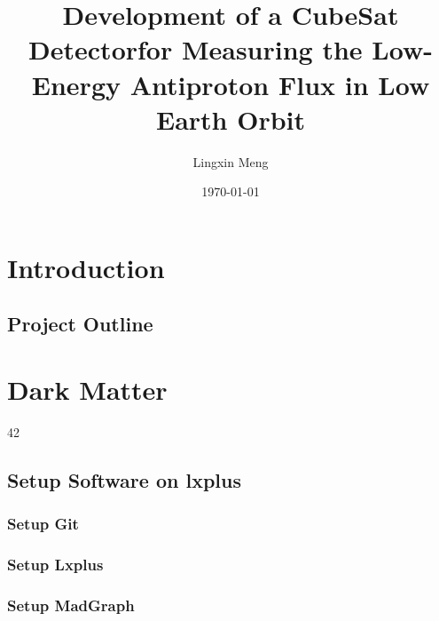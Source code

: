 \documentclass[twoside,11pt,a4paper]{book}
\newcommand{\thauthor}{Lingxin Meng}
\newcommand{\thtitle}{Development of a CubeSat Detector}
\newcommand{\thsubtitle}{for Measuring the Low-Energy Antiproton Flux in Low Earth Orbit}
\begin{document}
\pagestyle{fancy}
\title{\thtitle \thsubtitle}
\author{\thauthor}
\date{\today}


\begin{titlepage}
	\thispagestyle{empty}
%	
	\clearpage
\end{titlepage}

\newpage
\thispagestyle{empty}
\mbox{}

\newpage
\thispagestyle{empty}
\begin{center}
	\begin{minipage}[c][150mm][c]{100mm}
%		
	\end{minipage}
\end{center}

\acresetall 
\clearpage

\newpage
\thispagestyle{empty}
\mbox{}

\tableofcontents

\clearpage

\setcounter{page}{1}
\chapter{Introduction}
	\label{sec:introduction}
	\section{Project Outline}

\chapter{Dark Matter}
	\label{chap:dm}
	\epigraph{\hfill 42}{}
	\section{Setup Software on lxplus}
		\label{sec:antiproton_sources}
		\subsection{Setup Git}
		
		\subsection{Setup Lxplus}
		
		\subsection{Setup MadGraph}
		
\end{document}
